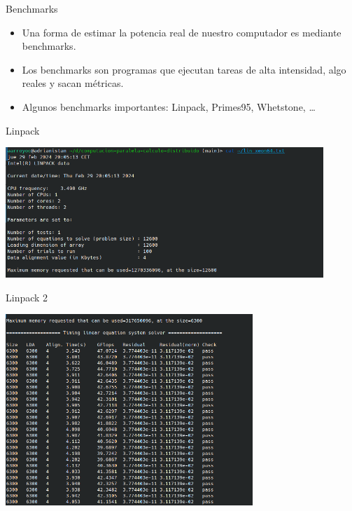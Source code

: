 \documentclass[bigger]{beamer}
\begin{document}
\begin{frame}[label={sec:org41686be}]{Benchmarks}
\begin{itemize}
\item Una forma de estimar la potencia real de nuestro computador es mediante benchmarks.

\item Los benchmarks son programas que ejecutan tareas de alta intensidad, algo reales y sacan métricas.

\item Algunos benchmarks importantes: Linpack, Primes95, Whetstone, \ldots{}
\end{itemize}
\end{frame}

\begin{frame}[label={sec:org7101ea0}]{Linpack}
\begin{center}
\includegraphics[width=0.9\textwidth]{./Linpack1.png}
\end{center}
\end{frame}

\begin{frame}[label={sec:orgc4c3265}]{Linpack 2}
\begin{center}
\includegraphics[width=0.7\textwidth]{./Linpack2.png}
\end{center}
\end{frame}
\end{document}

